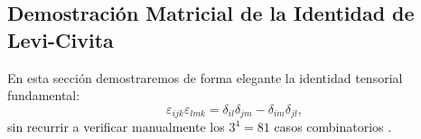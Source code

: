 
\begin{appendices}

\section{Demostración Matricial de la Identidad de Levi-Civita}
\label{anexo:levi_civita}

En esta sección demostraremos de forma elegante la identidad tensorial fundamental:
\begin{equation}
    \varepsilon_{ijk}\varepsilon_{lmk} = \delta_{il}\delta_{jm} - \delta_{im}\delta_{jl},
\end{equation}
sin recurrir a verificar manualmente los $3^4 = 81$ casos combinatorios \cite{sakurai}.


\end{appendices}
